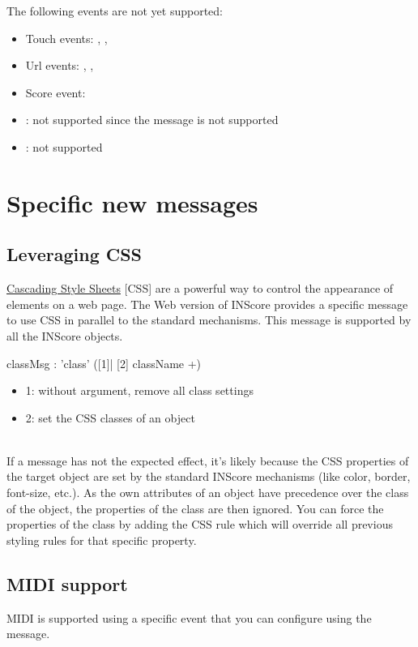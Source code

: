 \documentclass[a4paper,twoside]{article}
\newcommand{\toplevel}[1]	{\section{#1}}
\newcommand{\sublevel}[1]	{\subsection{#1}}
\begin{document}
The following events are not yet supported:
\begin{itemize}
\item Touch events: , , 
\item Url events: , , 
\item Score event: 
\item {}: not supported since the  message is not supported
\item {}: not supported
\end{itemize}

\toplevel{Specific new messages}
\label{newMessages}

\sublevel{Leveraging CSS}
\label{webCSS}

\href{https://www.w3schools.com/css/css_intro.asp}{Cascading Style Sheets} [CSS] are a powerful way to control the appearance of elements on a web page. The Web version of INScore provides a specific  message to use CSS in parallel to the standard mechanisms. This message is supported by all the INScore objects.

\begin{rail}
classMsg : 'class' ([1]| [2] className +)
\end{rail}

\begin{itemize}
\item 1: without argument, remove all class settings
\item 2: set the CSS classes of an object
\end{itemize}

\note{}\\
If a  message has not the expected effect, it's likely because the CSS properties of the target object are set by the standard INScore mechanisms (like color, border, font-size, etc.). As the own attributes of an object have precedence over the class of the object, the properties of the class are then ignored. You can force the properties of the class by adding the CSS rule  which will override all previous styling rules for that specific property.

\sublevel{MIDI support}
\label{webMIDI}

MIDI is supported using a specific event that you can configure using the  message. 
\end{document}
